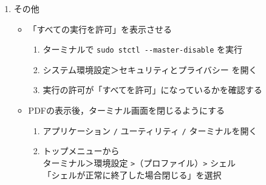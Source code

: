 \documentclass{ujarticle}
\begin{document}
\begin{enumerate}[\bf\large 1.]
\item その他

\begin{itemize}
 \item 「すべての実行を許可」を表示させる
\begin{enumerate}[(1)]
\item ターミナルで \verb|sudo stctl --master-disable| を実行
\item システム環境設定＞セキュリティとプライバシー を開く
\item 実行の許可が「すべてを許可」になっているかを確認する
   \end{enumerate}

    \item PDFの表示後，ターミナル画面を閉じるようにする
       \begin{enumerate}[(1)]
        \item アプリケーション \verb|/| ユーティリティ \verb|/| ターミナルを開く
        \item トップメニューから\\
          \hspace*{5mm}ターミナル＞環境設定 \verb|>|（プロファイル）\verb|>| シェル\\
          \hspace*{10mm}「シェルが正常に終了した場合閉じる」を選択
        \end{enumerate}
\end{itemize}

\end{enumerate}
\end{document}
